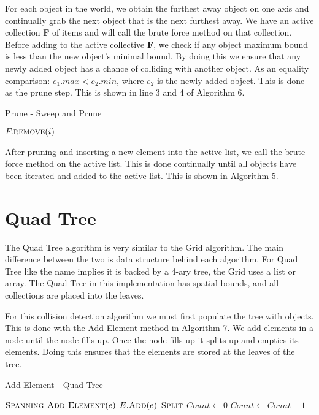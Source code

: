 \documentclass[conference]{IEEEtran}
\begin{document}
For each object in the world, we obtain the furthest away object on one axis and continually grab the next object that is the next furthest away. We have an active collection \textbf{F} of items and will call the brute force method on that collection. Before adding to the active collective \textbf{F}, we check if any object maximum bound is less than the new object's minimal bound. By doing this we ensure that any newly added object has a chance of colliding with another object. As an equality comparison: $e_{1}.max < e_{2}.min$, where $e_{2}$ is the newly added object. This is done as the prune step. This is shown in line 3 and 4 of Algorithm 6.

\begin{algorithm}
\caption{Prune - Sweep and Prune}
\begin{algorithmic}[1]
                        \State $F.\Call{remove}{i}$
                \EndIf
        \EndFor
\EndFunction
\end{algorithmic}
\end{algorithm}

After pruning and inserting a new element into the active list, we call the brute force method on the active list. This is done continually until all objects have been iterated and added to the active list. This is shown in Algorithm 5.

\section{Quad Tree}

The Quad Tree algorithm is very similar to the Grid algorithm. The main difference between the two is data structure behind each algorithm. For Quad Tree like the name implies it is backed by a 4-ary tree, the Grid uses a list or array. The Quad Tree in this implementation has spatial bounds, and all collections are placed into the leaves.

For this collision detection algorithm we must first populate the tree with objects. This is done with the Add Element method in Algorithm 7. We add elements in a node until the node fills up. Once the node fills up it splits up and empties its elements. Doing this ensures that the elements are stored at the leaves of the tree.

\begin{algorithm}
\caption{Add Element - Quad Tree}
\begin{algorithmic}[1]
                        \State $\Call{Spanning Add Element}{e}$
        \Else
                \State $E.\Call{Add}{e}$
                        \State $\Call{Split}{}$
                        \State $Count \leftarrow 0$
                \Else
                        \State $Count \leftarrow Count + 1$
                \EndIf
        \EndIf
\EndFunction
\end{algorithmic}
\end{algorithm}
\end{document}
